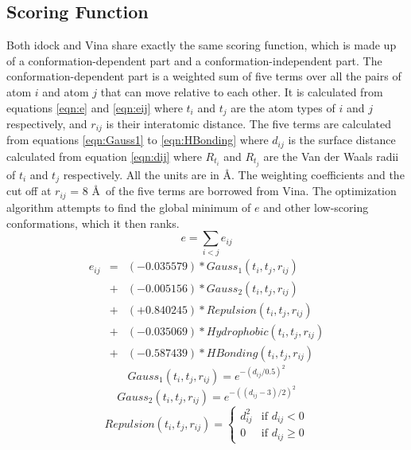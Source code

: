 \documentclass[10pt, conference, compsocconf]{../IEEEtran}
\begin{document}
\subsection{Scoring Function}

Both idock and Vina share exactly the same scoring function, which is made up of a conformation-dependent part and a conformation-independent part. The conformation-dependent part is a weighted sum of five terms over all the pairs of atom $i$ and atom $j$ that can move relative to each other. It is calculated from equations \eqref{eqn:e} and \eqref{eqn:eij} where $t_i$ and $t_j$ are the atom types of $i$ and $j$ respectively, and $r_{ij}$ is their interatomic distance. The five terms are calculated from equations \eqref{eqn:Gauss1} to \eqref{eqn:HBonding} where $d_{ij}$ is the surface distance calculated from equation \eqref{eqn:dij} where $R_{t_i}$ and $R_{t_j}$ are the Van der Waals radii of $t_i$ and $t_j$ respectively. All the units are in \AA. The weighting coefficients and the cut off at $r_{ij}$ = 8 \AA\ of the five terms are borrowed from Vina. The optimization algorithm attempts to find the global minimum of $e$ and other low-scoring conformations, which it then ranks.
\begin{equation}
\label{eqn:e}
e = \sum_{i < j} e_{ij}
\end{equation}
\begin{eqnarray}
\label{eqn:eij}
e_{ij} &=& (-0.035579) * Gauss_1(t_i, t_j, r_{ij}) \nonumber \\
       &+& (-0.005156) * Gauss_2(t_i, t_j, r_{ij}) \nonumber \\
       &+& (+0.840245) * Repulsion(t_i, t_j, r_{ij}) \nonumber \\
       &+& (-0.035069) * Hydrophobic(t_i, t_j, r_{ij}) \nonumber \\
       &+& (-0.587439) * HBonding(t_i, t_j, r_{ij})
\end{eqnarray}
\begin{equation}
\label{eqn:Gauss1}
Gauss_1(t_i, t_j, r_{ij}) = e^{-(d_{ij} / 0.5)^2}
\end{equation}
\begin{equation}
\label{eqn:Gauss2}
Gauss_2(t_i, t_j, r_{ij}) = e^{-((d_{ij} - 3) / 2)^2}
\end{equation}
\begin{equation}
\label{eqn:Repulsion}
Repulsion(t_i, t_j, r_{ij}) =
\begin{cases}
d_{ij}^2 & \text{if } d_{ij} < 0\\
0 &\text{if } d_{ij} \geq 0
\end{cases}
\end{equation}
\end{document}
